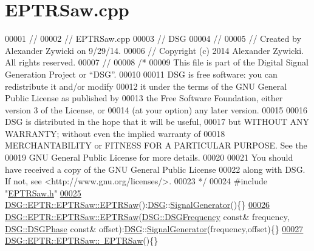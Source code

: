 \hypertarget{_e_p_t_r_saw_8cpp_source}{\section{E\+P\+T\+R\+Saw.\+cpp}
\label{_e_p_t_r_saw_8cpp_source}
}

\begin{DoxyCode}
00001 \textcolor{comment}{//}
00002 \textcolor{comment}{//  EPTRSaw.cpp}
00003 \textcolor{comment}{//  DSG}
00004 \textcolor{comment}{//}
00005 \textcolor{comment}{//  Created by Alexander Zywicki on 9/29/14.}
00006 \textcolor{comment}{//  Copyright (c) 2014 Alexander Zywicki. All rights reserved.}
00007 \textcolor{comment}{//}
00008 \textcolor{comment}{/*}
00009 \textcolor{comment}{ This file is part of the Digital Signal Generation Project or “DSG”.}
00010 \textcolor{comment}{}
00011 \textcolor{comment}{ DSG is free software: you can redistribute it and/or modify}
00012 \textcolor{comment}{ it under the terms of the GNU General Public License as published by}
00013 \textcolor{comment}{ the Free Software Foundation, either version 3 of the License, or}
00014 \textcolor{comment}{ (at your option) any later version.}
00015 \textcolor{comment}{}
00016 \textcolor{comment}{ DSG is distributed in the hope that it will be useful,}
00017 \textcolor{comment}{ but WITHOUT ANY WARRANTY; without even the implied warranty of}
00018 \textcolor{comment}{ MERCHANTABILITY or FITNESS FOR A PARTICULAR PURPOSE.  See the}
00019 \textcolor{comment}{ GNU General Public License for more details.}
00020 \textcolor{comment}{}
00021 \textcolor{comment}{ You should have received a copy of the GNU General Public License}
00022 \textcolor{comment}{ along with DSG.  If not, see <http://www.gnu.org/licenses/>.}
00023 \textcolor{comment}{ */}
00024 \textcolor{preprocessor}{#include "\hyperlink{_e_p_t_r_saw_8h}{EPTRSaw.h}"}
\hypertarget{_e_p_t_r_saw_8cpp_source_l00025}{}\hyperlink{class_d_s_g_1_1_e_p_t_r_1_1_e_p_t_r_saw_a65c2009548fb7f946d48ea794c830501}{00025} \hyperlink{class_d_s_g_1_1_e_p_t_r_1_1_e_p_t_r_saw_a65c2009548fb7f946d48ea794c830501}{DSG::EPTR::EPTRSaw::EPTRSaw}():\hyperlink{namespace_d_s_g}{DSG}::\hyperlink{class_d_s_g_1_1_signal_generator}{SignalGenerator}()\{\}
\hypertarget{_e_p_t_r_saw_8cpp_source_l00026}{}\hyperlink{class_d_s_g_1_1_e_p_t_r_1_1_e_p_t_r_saw_a3a571a16f3ef0e230db2daa0cd249855}{00026} \hyperlink{class_d_s_g_1_1_e_p_t_r_1_1_e_p_t_r_saw_a65c2009548fb7f946d48ea794c830501}{DSG::EPTR::EPTRSaw::EPTRSaw}(\hyperlink{namespace_d_s_g_a4315a061386fa1014fda09b15d3a6973}{DSG::DSGFrequency} \textcolor{keyword}{const}& frequency,
      \hyperlink{namespace_d_s_g_a44431ce1eb0a7300efdd207bc879e52c}{DSG::DSGPhase} \textcolor{keyword}{const}& offset):\hyperlink{namespace_d_s_g}{DSG}::\hyperlink{class_d_s_g_1_1_signal_generator}{SignalGenerator}(frequency,offset)\{\}
\hypertarget{_e_p_t_r_saw_8cpp_source_l00027}{}\hyperlink{class_d_s_g_1_1_e_p_t_r_1_1_e_p_t_r_saw_a932fb8ef2df61ed06e6cca5cdc622884}{00027} \hyperlink{class_d_s_g_1_1_e_p_t_r_1_1_e_p_t_r_saw_a932fb8ef2df61ed06e6cca5cdc622884}{DSG::EPTR::EPTRSaw::~EPTRSaw}()\{\}
\end{DoxyCode}
